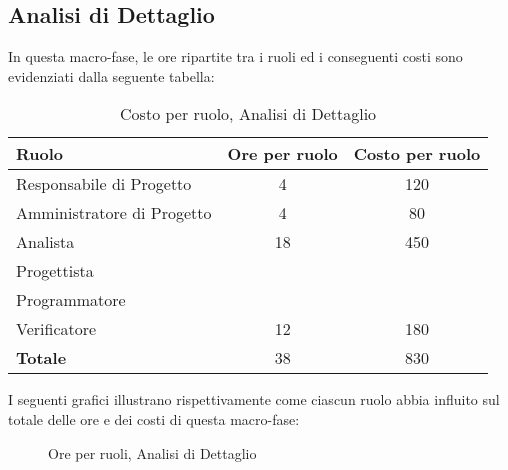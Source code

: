\subsection{Analisi di Dettaglio}
In questa macro-fase, le ore ripartite tra i ruoli ed i conseguenti costi sono evidenziati dalla seguente tabella:

\begin{table}[h]
\centering
\begin{tabular}{|l|c|c|}
	\toprule
	\textbf{Ruolo} & \textbf{Ore per ruolo} & \textbf{Costo per ruolo} \\
		
	\midrule
	Responsabile di Progetto & 4 & 120 \\
	Amministratore di Progetto & 4 & 80 \\ 
	Analista & 18 & 450 \\
	Progettista & & \\
	Programmatore & & \\
	Verificatore & 12 & 180 \\
	\midrule
	\textbf{Totale} & 38 & 830 \\
		
	\bottomrule
\end{tabular}
\caption{Costo per ruolo, Analisi di Dettaglio}
\end{table}

\newpage
\noindent I seguenti grafici illustrano rispettivamente come ciascun ruolo abbia influito sul totale delle ore e dei costi di questa macro-fase:

\begin{figure}[h]
\centering
{}
\caption{Ore per ruoli, Analisi di Dettaglio}
\end{figure}


